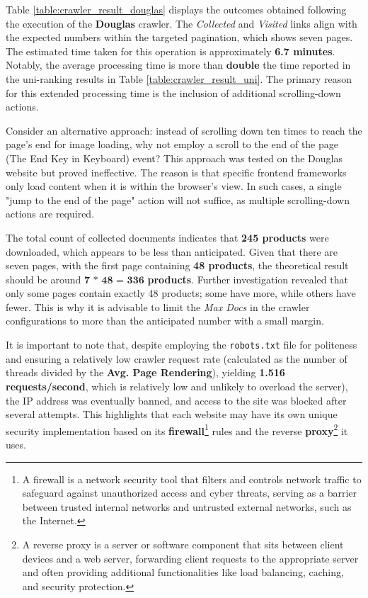 {Table \ref{table:crawler_result_douglas} displays the outcomes obtained following the execution of the \textbf{Douglas} crawler. The \textit{Collected} and \textit{Visited} links align with the expected numbers within the targeted pagination, which shows seven pages. The estimated time taken for this operation is approximately \textbf{6.7 minutes}. Notably, the average processing time is more than \textbf{double} the time reported in the uni-ranking results in Table \ref{table:crawler_result_uni}. The primary reason for this extended processing time is the inclusion of additional scrolling-down actions.

Consider an alternative approach: instead of scrolling down ten times to reach the page's end for image loading, why not employ a scroll to the end of the page (The End Key in Keyboard) event? This approach was tested on the Douglas website but proved ineffective. The reason is that specific frontend frameworks only load content when it is within the browser's view. In such cases, a single "jump to the end of the page" action will not suffice, as multiple scrolling-down actions are required.

The total count of collected documents indicates that \textbf{245 products} were downloaded, which appears to be less than anticipated. Given that there are seven pages, with the first page containing \textbf{48 products}, the theoretical result should be around \textbf{$\textbf{7 * 48 = 336}$} \textbf{products}. Further investigation revealed that only some pages contain exactly 48 products; some have more, while others have fewer. This is why it is advisable to limit the \textit{Max Docs} in the crawler configurations to more than the anticipated number with a small margin. 

It is important to note that, despite employing the \texttt{robots.txt} file for politeness and ensuring a relatively low crawler request rate (calculated as the number of threads divided by the \textbf{Avg. Page Rendering}), yielding \textbf{1.516 requests/second}, which is relatively low and unlikely to overload the server), the IP address was eventually banned, and access to the site was blocked after several attempts. This highlights that each website may have its own unique security implementation based on its \textbf{firewall}\footnote{A firewall is a network security tool that filters and controls network traffic to safeguard against unauthorized access and cyber threats, serving as a barrier between trusted internal networks and untrusted external networks, such as the Internet.} rules and the reverse \textbf{proxy}\footnote{A reverse proxy is a server or software component that sits between client devices and a web server, forwarding client requests to the appropriate server and often providing additional functionalities like load balancing, caching, and security protection.} it uses.

}
